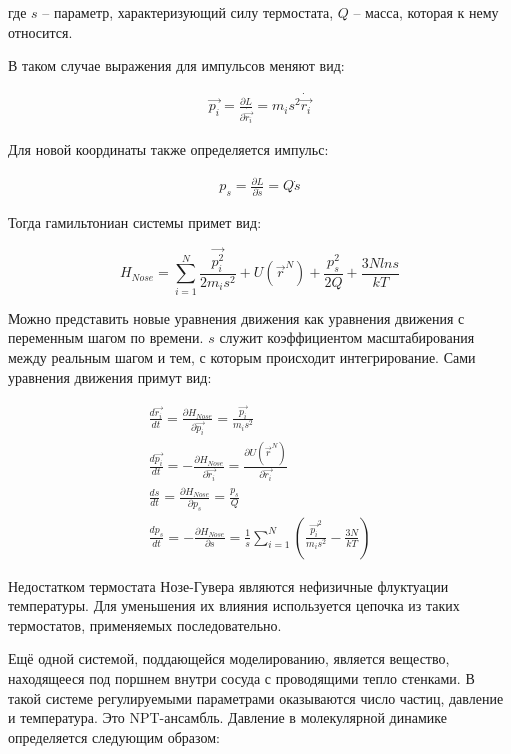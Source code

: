 где $s$ \--- параметр, характеризующий силу термостата, $Q$ \--- масса, которая к нему относится. 

В таком случае выражения для импульсов меняют вид:

\begin{align}
    \vec{p_i} = \frac{\partial L}{\partial \dot{\vec{r_i}}} = m_i s^2 \dot{\vec{r_i}}
\end{align}

Для новой координаты также определяется импульс:

\begin{align}
    p_s = \frac{\partial L}{\partial \dot{s}} = Q \dot{s}
\end{align}

Тогда гамильтониан системы примет вид:

\begin{equation}
    H_{Nose} = \sum_{i=1}^N \frac{\vec{p_i^2}}{2m_is^2} + U(\vec{r}^N) + \frac{p_s^2}{2Q} + \frac{3N ln s}{kT}
\end{equation}

Можно представить новые уравнения движения как уравнения движения с переменным шагом по времени. $s$ служит коэффициентом масштабирования между реальным шагом и тем, с которым происходит интегрирование. Сами уравнения движения примут вид:

\begin{subequations}
	\begin{gather}
		\frac{d\vec{r_i}}{dt} = \frac{\partial H_{Nose}}{\partial \vec{p_i}} = \frac{\vec{p_i}}{m_i s^2} \\
		\frac{d\vec{p_i}}{dt} = -\frac{\partial H_{Nose}}{\partial \vec{r_i}} = \frac{\partial U(\vec{r}^N)}{\partial \vec{r_i}} \\
		\frac{ds}{dt} = \frac{\partial H_{Nose}}{\partial p_s} = \frac{p_s}{Q} \\
		\frac{d p_s}{dt} = -\frac{\partial H_{Nose}}{\partial s} = \frac{1}{s} \sum_{i=1}^N (\frac{\vec{p_i}^2}{m_i s^2} - \frac{3N}{kT}) 
	\end{gather}
\end{subequations}

Недостатком термостата Нозе-Гувера являются нефизичные флуктуации температуры. Для уменьшения их влияния используется цепочка из таких термостатов, применяемых последовательно.

Ещё одной системой, поддающейся моделированию, является вещество, находящееся под поршнем внутри сосуда с проводящими тепло стенками. В такой системе регулируемыми параметрами оказываются число частиц, давление и температура. Это NPT-ансамбль. Давление в молекулярной динамике определяется следующим образом:

